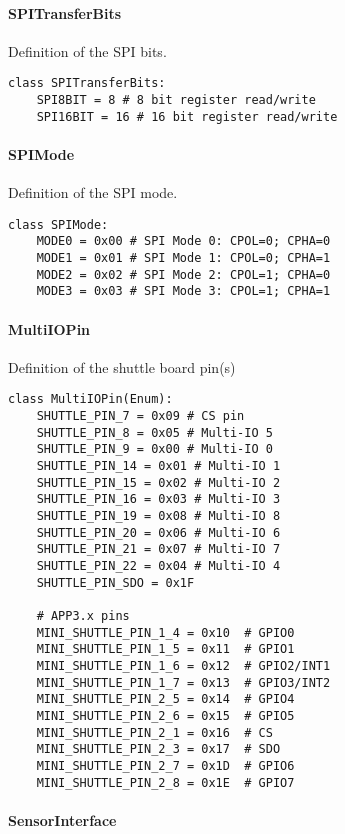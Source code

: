 \paragraph{SPITransferBits}\label{SPITransferBits}

Definition of the SPI bits.

\begin{lstlisting}
class SPITransferBits:
	SPI8BIT = 8 # 8 bit register read/write
	SPI16BIT = 16 # 16 bit register read/write
\end{lstlisting}

\paragraph{SPIMode}\label{SPIMode}

Definition of the SPI mode.

\begin{lstlisting}
class SPIMode:
	MODE0 = 0x00 # SPI Mode 0: CPOL=0; CPHA=0
	MODE1 = 0x01 # SPI Mode 1: CPOL=0; CPHA=1
	MODE2 = 0x02 # SPI Mode 2: CPOL=1; CPHA=0
	MODE3 = 0x03 # SPI Mode 3: CPOL=1; CPHA=1
\end{lstlisting}

\paragraph{MultiIOPin}\label{MultiIOPin}

Definition of the shuttle board pin(s)

\begin{lstlisting}
class MultiIOPin(Enum):
	SHUTTLE_PIN_7 = 0x09 # CS pin
	SHUTTLE_PIN_8 = 0x05 # Multi-IO 5
	SHUTTLE_PIN_9 = 0x00 # Multi-IO 0
	SHUTTLE_PIN_14 = 0x01 # Multi-IO 1
	SHUTTLE_PIN_15 = 0x02 # Multi-IO 2
	SHUTTLE_PIN_16 = 0x03 # Multi-IO 3
	SHUTTLE_PIN_19 = 0x08 # Multi-IO 8
	SHUTTLE_PIN_20 = 0x06 # Multi-IO 6
	SHUTTLE_PIN_21 = 0x07 # Multi-IO 7
	SHUTTLE_PIN_22 = 0x04 # Multi-IO 4
	SHUTTLE_PIN_SDO = 0x1F

	# APP3.x pins
	MINI_SHUTTLE_PIN_1_4 = 0x10  # GPIO0
	MINI_SHUTTLE_PIN_1_5 = 0x11  # GPIO1
	MINI_SHUTTLE_PIN_1_6 = 0x12  # GPIO2/INT1
	MINI_SHUTTLE_PIN_1_7 = 0x13  # GPIO3/INT2
	MINI_SHUTTLE_PIN_2_5 = 0x14  # GPIO4
	MINI_SHUTTLE_PIN_2_6 = 0x15  # GPIO5
	MINI_SHUTTLE_PIN_2_1 = 0x16  # CS
	MINI_SHUTTLE_PIN_2_3 = 0x17  # SDO
	MINI_SHUTTLE_PIN_2_7 = 0x1D  # GPIO6
	MINI_SHUTTLE_PIN_2_8 = 0x1E  # GPIO7
\end{lstlisting}

\paragraph{SensorInterface}\label{SensorInterface}

